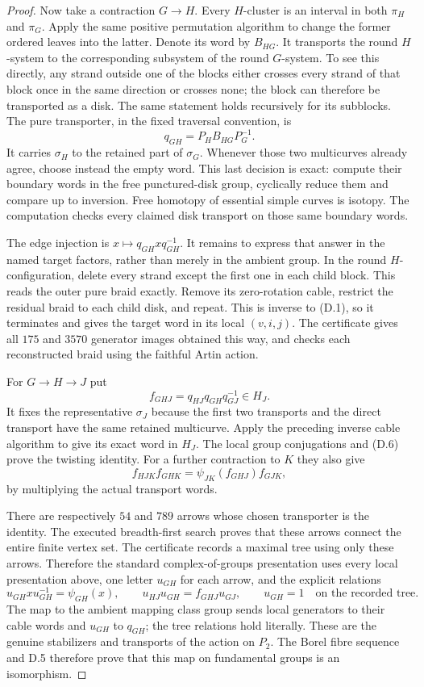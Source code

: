 \begin{proof}
Now take a contraction $G\to H$.  Every $H$-cluster is an
interval in both $\pi_H$ and $\pi_G$.  Apply the same positive
permutation algorithm to change the former ordered leaves
into the latter.  Denote its word by $B_{HG}$.  It transports
the round $H$-system to the corresponding subsystem of the
round $G$-system.  To see this directly, any strand outside
one of the blocks either crosses every strand of that block
once in the same direction or crosses none; the block can
therefore be transported as a disk.  The same statement holds
recursively for its subblocks.  The pure transporter, in the
fixed traversal convention, is
\[
                q_{GH}=P_H B_{HG}P_G^{-1}.                   \tag{D.5}
\]
It carries $\sigma_H$ to the retained part of $\sigma_G$.
Whenever those two multicurves already agree, choose instead
the empty word.  This last decision is exact: compute their
boundary words in the free punctured-disk group, cyclically
reduce them and compare up to inversion.  Free homotopy of
essential simple curves is isotopy.  The computation checks
every claimed disk transport on those same boundary words.

The edge injection is $x\mapsto q_{GH}xq_{GH}^{-1}$.
It remains to express that answer in the named target factors,
rather than merely in the ambient group.  In the round
$H$-configuration, delete every strand except the first one
in each child block.  This reads the outer pure braid exactly.
Remove its zero-rotation cable, restrict the residual braid to
each child disk, and repeat.  This is inverse to (D.1), so it
terminates and gives the target word in its local $(v,i,j)$.
The certificate gives all $175$ and $3570$ generator images
obtained this way, and checks each reconstructed braid using
the faithful Artin action.

For $G\to H\to J$ put
\[
       f_{GHJ}=q_{HJ}q_{GH}q_{GJ}^{-1}\in H_J.               \tag{D.6}
\]
It fixes the representative $\sigma_J$ because the first two
transports and the direct transport have the same retained
multicurve.  Apply the preceding inverse cable algorithm to
give its exact word in $H_J$.  The local group conjugations
and (D.6) prove the twisting identity.  For a further
contraction to $K$ they also give
\[
 f_{HJK}f_{GHK}
       =\psi_{JK}(f_{GHJ})f_{GJK},                           \tag{D.7}
\]
by multiplying the actual transport words.

There are respectively $54$ and $789$ arrows whose chosen
transporter is the identity.  The executed breadth-first
search proves that these arrows connect the entire finite
vertex set.  The certificate records a maximal tree using
only these arrows.  Therefore the standard complex-of-groups
presentation uses every local presentation above, one letter
$u_{GH}$ for each arrow, and the explicit relations
\[
 u_{GH}x u_{GH}^{-1}=\psi_{GH}(x),\qquad
 u_{HJ}u_{GH}=f_{GHJ}u_{GJ},\qquad
 u_{GH}=1\quad\text{on the recorded tree}.                   \tag{D.8}
\]
The map to the ambient mapping class group sends local
generators to their cable words and $u_{GH}$ to $q_{GH}$;
the tree relations hold literally.  These are the genuine
stabilizers and transports of the action on $P_2$.
The Borel fibre sequence and D.5 therefore prove that this
map on fundamental groups is an isomorphism.


\end{proof}

